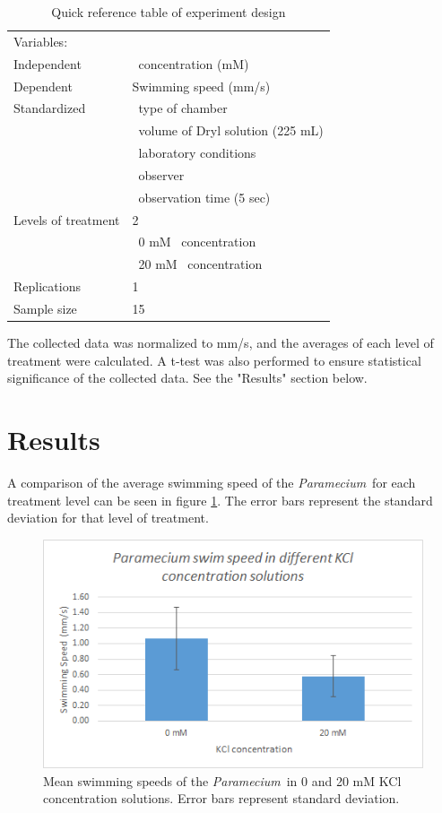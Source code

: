 \documentclass[12pt]{article}
\newcommand{\p}{\textit{Paramecium}}
\newcommand{\kcl}{\ce{KCl}}
\begin{document}
	\begin{table}[h]
		\centering
		\begin{tabular}{|l|l|}
			\hline
			Variables:&\\
			\qquad Independent & \kcl\ concentration (mM) \\ \hline
			\qquad Dependent & Swimming speed (mm/s)\\ \hline
			\qquad Standardized & \quad\textbullet\ type of chamber\\ 
			& \quad\textbullet\ volume of Dryl solution (225 mL) \\
			& \quad\textbullet\ laboratory conditions \\
			& \quad\textbullet\ observer \\
			& \quad\textbullet\ observation time (5 sec)\\ \hline
			Levels of treatment & 2\\
			& \quad\textbullet\ 0 mM \kcl\ concentration \\
			& \quad\textbullet\ 20 mM \kcl\ concentration\\ \hline
			Replications & 1 \\ \hline
			Sample size & 15 \\
			\hline
		\end{tabular}
		\caption{Quick reference table of experiment design}
		\label{refTable}
	\end{table}
	
	The collected data was normalized to mm/s, and the averages of each level of treatment were calculated. A t-test was also performed to ensure statistical significance of the collected data. See the "Results" section below. 
	
\section{Results}
	A comparison of the average swimming speed of the \p\ for each treatment level can be seen in figure \ref{barGraph}. The error bars represent the standard deviation for that level of treatment. \newpage
	\begin{figure}[t]
		\centering
		\includegraphics{chart1.png}
		\caption{Mean swimming speeds of the \p\ in 0 and 20 mM KCl concentration solutions. Error bars represent standard deviation.}
		\label{barGraph}
	\end{figure} 
	
\end{document}
